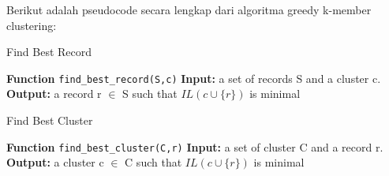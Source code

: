 \noindent Berikut adalah pseudocode secara lengkap dari algoritma greedy k-member clustering:

\begin{algorithm}[H]
  \caption{Find Best Record}\label{euclid}
  \begin{algorithmic}[1]
  \State \textbf{Function} \texttt{find\_best\_record(S,c)}
  \State \textbf{Input:} a set of records S and a cluster c.
  \State \textbf{Output:} a record r $\in$ S such that $IL(c \cup \{r\})$ is minimal
  \\
  \EndIf
  \EndFor
  \end{algorithmic}
\end{algorithm}

\begin{algorithm}[H]
  \caption{Find Best Cluster}\label{euclid}
  \begin{algorithmic}[1]
  \State \textbf{Function} \texttt{find\_best\_cluster(C,r)}
  \State \textbf{Input:} a set of cluster C and a record r.
  \State \textbf{Output:} a cluster c $\in$ C such that $IL(c \cup \{r\})$ is minimal
  \\
  \EndIf
  \EndFor
  \end{algorithmic}
\end{algorithm}

